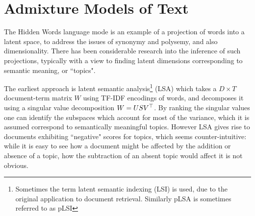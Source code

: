 

\section{Admixture Models of Text}
The Hidden Words language mode is an example of a projection of words into a latent space, to address the issues of synonymy and polysemy, and also dimensionality. There has been considerable research into the inference of such projections, typically with a view to finding latent dimensions corresponding to semantic meaning, or ``topics".

The earliest approach is latent semantic analysis\footnote{Sometimes the term latent semantic indexing (LSI) is used, due to the original application to document retrieval. Similarly pLSA is sometimes referred to as pLSI} (LSA)\cite{Deerwester1990} which takes a $D\times T$ document-term matrix $W$ using TF-IDF encodings of words, and decomposes it using a singular value decomposition $W = USV^\top$. By ranking the singular values one can identify the subspaces which account for most of the variance, which it is assumed correspond to semantically meaningful topics. However LSA gives rise to documents exhibiting ``negative" scores for topics, which seems counter-intuitive: while it is easy to see how a document might be affected by the addition or absence of a topic, how the subtraction of an absent topic would affect it is not obvious.

